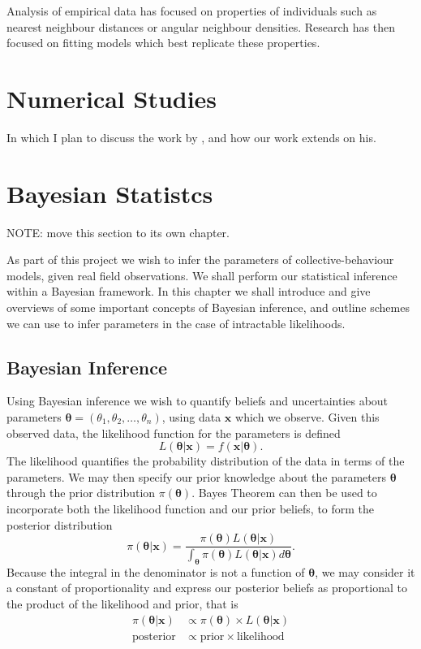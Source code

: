 Analysis of empirical data has focused on properties of individuals such as nearest neighbour distances or angular neighbour densities. Research has then focused on fitting models which best replicate these properties.

\section{Numerical Studies}
\label{sec:numerical_studies}

\color{red} In which I plan to discuss the work by \citet{mann11}, and how our work extends on his. \color{black}

\section{Bayesian Statistcs}	
\label{sec:bayes_intro}

\color{red} NOTE: move this section to its own chapter. \color{black}

As part of this project we wish to infer the parameters of collective-behaviour models, given real field observations. We shall perform our statistical inference within a Bayesian framework. In this chapter we shall introduce and give overviews of some important concepts of Bayesian inference, and outline schemes we can use to infer parameters in the case of intractable likelihoods.

\subsection{Bayesian Inference}
\label{ssec:bayes}

Using Bayesian inference we wish to quantify beliefs and uncertainties about parameters $\bm{\theta} = (\theta_1, \theta_2,\dots,\theta_n)$, using data $\bm{x}$ which we observe. Given this observed data, the likelihood function for the parameters is defined
\[
    L(\bm{\theta}|\bm{x}) = f(\bm{x}|\bm{\theta}).
\]
The likelihood quantifies the probability distribution of the data in terms of the parameters. We may then specify our prior knowledge about the parameters $\bm{\theta}$ through the prior distribution $\pi(\bm{\theta})$. Bayes Theorem can then be used to incorporate both the likelihood function and our prior beliefs, to form the posterior distribution
\begin{equation}
\label{eq:bayes_theorem}
    \pi(\bm{\theta}|\bm{x}) = \frac{\pi({\bm{\theta}})L(\bm{\theta}|\bm{x})}{\int_{\bm{\theta}} \pi(\bm{\theta})L(\bm{\theta}|\bm{x})d\bm{\theta}}.
\end{equation}
Because the integral in the denominator is not a function of $\bm{\theta}$, we may consider it a constant of proportionality and express our posterior beliefs as proportional to the product of the likelihood and prior, that is
\begin{align*}
    \pi(\bm{\theta}|\bm{x}) &\propto \pi(\bm{\theta}) \times L(\bm{\theta}|\bm{x})\\
    \text{posterior} &\propto \text{prior} \times \text{likelihood}
\end{align*}

